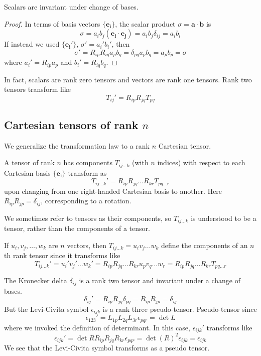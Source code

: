 \documentclass[a4paper]{article}
\begin{document}
\begin{prop}[Scalars]
Scalars are invariant under change of bases.
\end{prop}
\begin{proof}
In terms of basis vectors $\{\mathbf{e_i}\}$, the scalar product $\sigma=\mathbf{a}\cdot\mathbf{b}$ is
$$\sigma=a_ib_j(\mathbf{e_i}\cdot\mathbf{e_j})=a_ib_j\delta_{ij}=a_ib_i$$
If instead we used $\{\mathbf{e_i'}\}$, $\sigma'=a_i'b_i'$, then
$$\sigma'=R_{ip}R_{iq}a_pb_q=\delta_{pq}a_pb_q=a_pb_p=\sigma$$
where $a_i'=R_{ip}a_p$ and $b_i'=R_{iq}b_q$.
\end{proof}
In fact, scalars are rank zero tensors and vectors are rank one tensors. Rank two tensors transform like
$$T_{ij}'=R_{ip}R_{jq}T_{pq}$$
\newpage
\subsection{Cartesian tensors of rank $n$}
We generalize the transformation law to a rank $n$ Cartesian tensor.
\begin{defi}
A tensor of rank $n$ has components $T_{ij\dots k}$ (with $n$ indices) with respect to each Cartesian basis $\{\mathbf{e_i}\}$ transform as
$$T_{ij\dots k}'=R_{ip}R_{jq}\dots R_{kr}T_{pq\dots r}$$
upon changing from one right-handed Cartesian basis to another. Here $R_{ip}R_{jp}=\delta_{ij}$, corresponding to a rotation.
\end{defi}
\begin{notation}
We sometimes refer to tensors as their components, so $T_{ij\dots k}$ is understood to be a tensor, rather than the components of a tensor.
\end{notation}
\begin{eg}
If $u_i,v_j,\dots,w_k$ are $n$ vectors, then $T_{ij\dots k}=u_iv_j\dots w_k$ define the components of an $n$th rank tensor since it transforms like
$$T_{ij\dots k}'=u_i'v_j'\dots w_k'=R_{ip}R_{jq}\dots R_{kr}u_pv_q\dots w_r=R_{ip}R_{jq}\dots R_{kr}T_{pq\dots r}$$
\end{eg}
\begin{eg}
The Kronecker delta $\delta_{ij}$ is a rank two tensor and invariant under a change of bases.
$$\delta_{ij}'=R_{ip}R_{jq}\delta_{pq}=R_{ip}R_{jp}=\delta_{ij}$$
But the Levi-Civita symbol $\epsilon_{ijk}$ is a rank three pseudo-tensor. Pseudo-tensor since
$$\epsilon_{123}'=L_{1p}L_{2q}L_{3r}\epsilon_{pqr}=\det L$$
where we invoked the definition of determinant. In this case, $\epsilon_{ijk}'$ transforms like
$$\epsilon_{ijk}'=\det RR_{ip}R_{jq}R_{kr}\epsilon_{pqr}=\det(R)^2\epsilon_{ijk}=\epsilon_{ijk}$$
We see that the Levi-Civita symbol transforms as a pseudo tensor. 
\end{eg}
\end{document}

